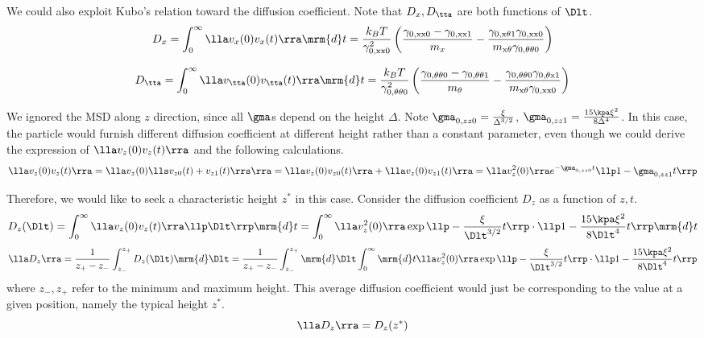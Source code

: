 We could also exploit Kubo's relation toward the diffusion coefficient. Note that $D_x, D_\tta$ are both functions of $\Dlt$.
$$ D_x = \int_0^\infty \lla v_x(0) v_x(t) \rra \mrm{d}t = \frac{k_B T}{\gamma _{0,\text{xx0}}^2} \left(\frac{\gamma _{0,\text{xx0}}-\gamma _{0,\text{xx1}}}{m_x}-\frac{\gamma _{0,\text{x$\theta $1}} \gamma _{0,\text{xx0}}}{m_{\text{x$\theta $}} \gamma _{0,\text{$\theta \theta $0}}}\right) $$

$$ D_\tta = \int_0^\infty \lla v_\tta(0) v_\tta(t) \rra \mrm{d}t = \frac{k_B T}{\gamma _{0,\text{$\theta \theta $0}}^2} \left(\frac{\gamma _{0,\text{$\theta \theta $0}}-\gamma _{0,\text{$\theta \theta $1}}}{m_{\theta }}-\frac{\gamma _{0,\text{$\theta \theta $0}} \gamma _{0,\text{$\theta $x1}}}{m_{\text{x$\theta $}} \gamma _{0,\text{xx0}}}\right) $$



We ignored the MSD along $z$ direction, since all $\gma$s depend on the height $\Delta$. Note $\gma_{0,zz0} = \frac{\xi}{\Delta^{3/2}}$, $\gma_{0,zz1} = \frac{15 \kpa \xi^2}{8 \Delta^4}$. In this case, the particle would furnish different diffusion coefficient at different height rather than a constant parameter, even though we could derive the expression of $\lla v_z(0) v_z(t) \rra$ and the following calculations. 
$$ \lla v_z(0) v_z(t) \rra = \lla v_z(0) \lls v_{z0}(t) + v_{z1}(t) \rrs \rra = \lla v_z(0) v_{z0}(t) \rra + \lla v_z(0) v_{z1}(t) \rra = \lla v_z^2(0) \rra e^{-\gma_{0,zz0} t} \llp 1 - \gma_{0,zz1} t \rrp $$


Therefore, we would like to seek a characteristic height $z^\ast$ in this case. Consider the diffusion coefficient $D_z$ as a function of $z,t$. 
$$ D_z(\Dlt) = \int_0^\infty \lla v_z(0) v_z(t) \rra \llp \Dlt \rrp \mrm{d}t = \int_0^\infty \lla v_z^2(0) \rra \exp \llp - \frac{\xi}{\Dlt^{3/2}} t \rrp \cdot \llp 1 - \frac{15 \kpa \xi^2}{8 \Dlt^4} t \rrp \mrm{d}t $$
$$ \lla D_z \rra = \frac{1}{z_+ - z_-} \int_{z_-}^{z_+} D_z(\Dlt) \mrm{d}\Dlt = \frac{1}{z_+ - z_-} \int_{z_-}^{z_+} \mrm{d}\Dlt \int_0^\infty \mrm{d}t  \lla v_z^2(0) \rra \exp \llp - \frac{\xi}{\Dlt^{3/2}} t \rrp \cdot \llp 1 - \frac{15 \kpa \xi^2}{8 \Dlt^4} t \rrp $$
where $z_-, z_+$ refer to the minimum and maximum height. This average diffusion coefficient would just be corresponding to the value at a given position, namely the typical height $z^\ast$. 
$$ \lla D_z \rra = D_z(z^\ast) $$






